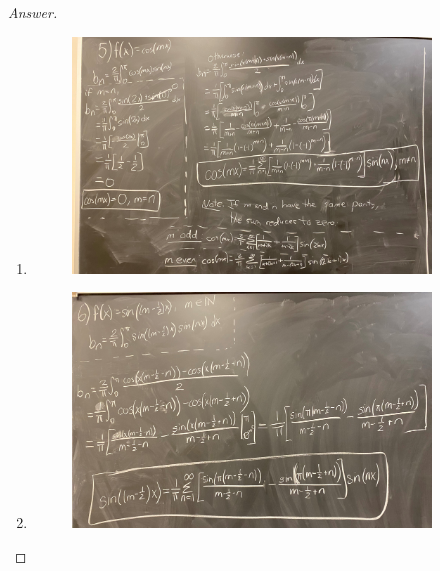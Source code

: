 \documentclass{article}
\theoremstyle{definition}
\renewcommand\qedsymbol{$\blacksquare$}
\newenvironment{ans}{\begin{proof}[Answer]\renewcommand{\qedsymbol}{}}{\end{proof}}
\begin{document}
\begin{ans}
\begin{enumerate}
        \item \phantom{.} \begin{figure}[H]
            \centering
            \includegraphics[width = 0.9\textwidth]{Problem 4-5.png}
        \end{figure}
        
        \item \phantom{.} \begin{figure}[H]
            \centering
            \includegraphics[width = 0.9\textwidth]{Problem 4-6.png}
        \end{figure}
    \end{enumerate}
\end{ans}
\end{document}
